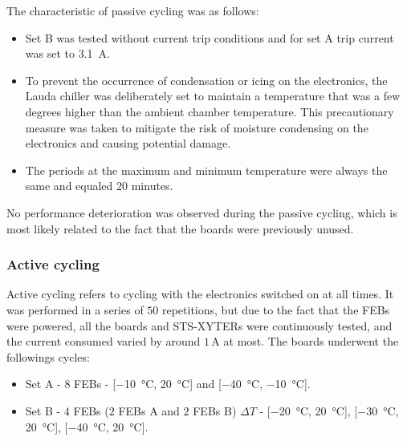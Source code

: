 The characteristic of passive cycling was as follows:
\begin{itemize}
    \item  Set B was tested without current trip conditions  and for set A trip current was set to \SI{3.1}{\ampere}.
    \item To prevent the occurrence of condensation or icing on the electronics, the Lauda chiller was deliberately set to maintain a temperature that was a few degrees higher than the ambient chamber temperature. This precautionary measure was taken to mitigate the risk of moisture condensing on the electronics and causing potential damage.
    \item The periods at the maximum and minimum temperature were always the same and equaled $20$ minutes.
\end{itemize}
No performance deterioration was observed during the passive cycling, which is most likely related to the fact that the boards were previously unused. 

\subsubsection{Active cycling}
Active cycling refers to cycling with the electronics switched on at all times. It was performed in a series of $50$ repetitions, but due to the fact that the \glspl{FEB} were powered, all the boards and STS-XYTERs were continuously tested, and the current consumed varied by around $1$\,A at most. The boards underwent the followings cycles:
\begin{itemize}
    \item Set A - $8$ \glspl{FEB} - [\SI{-10}{\celsius}, \SI{20}{\celsius}] and [\SI{-40}{\celsius}, \SI{-10}{\celsius}].
    \item Set B - $4$ \glspl{FEB} ($2$ \glspl{FEB} A and $2$ \glspl{FEB} B)  $\Delta T$ - [\SI{-20}{\celsius}, \SI{20}{\celsius}], [\SI{-30}{\celsius}, \SI{20}{\celsius}], [\SI{-40}{\celsius}, \SI{20}{\celsius}].
\end{itemize}

